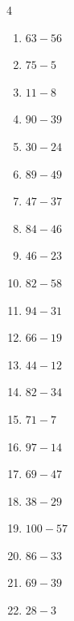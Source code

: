 \begin{multicols}{4}
\begin{enumerate}
  \item $63-56$
        \phantom{$=7$}

  \item $75-5$
        \phantom{$=70$}

  \item $11-8$
        \phantom{$=3$}

  \item $90-39$
        \phantom{$=51$}

  \item $30-24$
        \phantom{$=6$}

  \item $89-49$
        \phantom{$=40$}

  \item $47-37$
        \phantom{$=10$}

  \item $84-46$
        \phantom{$=38$}

\columnbreak %

  \item $46-23$
        \phantom{$=23$}

  \item $82-58$
        \phantom{$=24$}

  \item $94-31$
        \phantom{$=63$}

  \item $66-19$
        \phantom{$=47$}

  \item $44-12$
        \phantom{$=32$}

  \item $82-34$
        \phantom{$=48$}

  \item $71-7$
        \phantom{$=64$}

  \item $97-14$
        \phantom{$=83$}

  \item $69-47$
        \phantom{$=22$}

  \item $38-29$
        \phantom{$=9$}

  \item $100-57$
        \phantom{$=43$}

  \item $86-33$
        \phantom{$=53$}

  \item $69-39$
        \phantom{$=30$}

  \item $28-3$
        \phantom{$=25$}


\end{enumerate}
\end{multicols}
